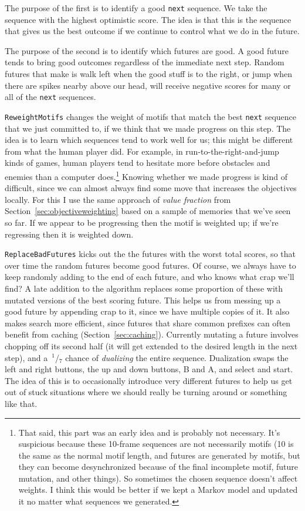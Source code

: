 \documentclass[twocolumn]{article}
\newcommand\sfrac[2]{{}\,$^{#1}$\!/{}\!$_{#2}$}
\begin{document}
The purpose of the first is to identify a good {\tt next} sequence. We
take the sequence with the highest optimistic score. The idea is that
this is the sequence that gives us the best outcome if we continue
to control what we do in the future.

The purpose of the second is to identify which futures are good. A
good future tends to bring good outcomes regardless of the immediate
next step. Random futures that make is walk left when the good stuff
is to the right, or jump when there are spikes nearby above our head,
will receive negative scores for many or all of the {\tt next}
sequences.

{\tt ReweightMotifs} changes the weight of motifs that match the best
{\tt next} sequence that we just committed to, if we think that we
made progress on this step. The idea is to learn which sequences tend
to work well for us; this might be different from what the human
player did. For example, in run-to-the-right-and-jump kinds of games,
human players tend to hesitate more before obstacles and enemies than
a computer does.\footnote{That said, this part was an early idea and
  is probably not necessary. It's suspicious because these 10-frame
  sequences are not necessarily motifs (10 is the same as the normal
  motif length, and futures are generated by motifs, but they can
  become desynchronized because of the final incomplete motif, future
  mutation, and other things). So sometimes the chosen sequence
  doesn't affect weights. I think this would be better if we kept a
  Markov model and updated it no matter what sequences we generated.}
Knowing whether we made progress is kind of difficult, since we can
almost always find some move that increases the objectives locally.
For this I use the same approach of {\em value fraction} from
Section~\ref{sec:objectiveweighting} based on a sample of memories
that we've seen so far. If we appear to be progressing then the motif
is weighted up; if we're regressing then it is weighted down.

{\tt ReplaceBadFutures} kicks out the the futures with the worst total
scores, so that over time the random futures become good futures. Of
course, we always have to keep randomly adding to the end of each
future, and who knows what crap we'll find? A late addition to the
algorithm replaces some proportion of these with mutated versions of
the best scoring future. This helps us from messing up a good future
by appending crap to it, since we have multiple copies of it. It also
makes search more efficient, since futures that share common prefixes
can often benefit from caching (Section~\ref{sec:caching}). Currently
mutating a future involves chopping off its second half (it will get
extended to the desired length in the next step), and a \sfrac{1}{7}
chance of {\em dualizing} the entire sequence. Dualization swaps
the left and right buttons, the up and down buttons, B and A, and 
select and start. The idea of this is to occasionally introduce
very different futures to help us get out of stuck situations where
we should really be turning around or something like that.
\end{document}
